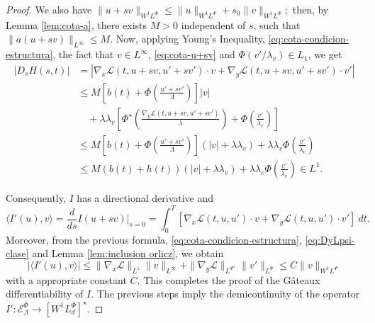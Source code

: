 \documentclass[twoside]{article}
\theoremstyle{remark}
\newcommand{\orlnor}{\|_{L^{\Phi}}}
\newcommand{\linf}{\|_{L^{\infty}}}
\newcommand{\lphi}{L^{\Phi}}
\newcommand{\lpsi}{L^{\Phi^{\star}}}
\newcommand{\wphi}{W^{1}\lphi}
\newcommand{\sobnor}{\|_{W^{1}\lphi}}
\newcommand{\domi}{\mathcal{E}^{\Phi}}
\renewcommand{\leq}{\leqslant}
\begin{document}
\begin{proof}
We also have
$
\|u+sv\sobnor\leq \|u\sobnor+s_0\|v\sobnor;
$
then, by Lemma \ref{lem:cota-a}, there exists $M>0$ independent of $s$, such that
$\|a(u+sv)\linf\leq M$. Now, applying Young's Inequality,  \eqref{eq:cota-condicion-estructura},
the fact that $v \in L^{\infty}$, \eqref{eq:cota-u+sv} and $\Phi(v'/\lambda_v)\in L_1$, 
we get
\begin{equation}\label{ctg}
\begin{split}
|D_s H(s,t)|&=\left| \nabla_x\mathcal{L}(t,u+sv,u'+sv')\cdot v +
  \nabla_y\mathcal{L}(t, u+s v, u'+sv')\cdot v'\right| \\
  & \leq M \left[ b(t)+ \Phi\left(\frac{u'+sv'}{\Lambda}\right)\right]|v|\\
 &\quad+ \lambda\lambda_v\left[\Phi^{\star}\left(\frac{\nabla_y\mathcal{L}(t,u+sv,u'+sv')}{\lambda}\right)+\Phi\left(\frac{v'}{\lambda_v}\right) \right]
\\
 &\leq 
 M \left[ b(t)+ \Phi\left(\frac{u'+sv'}{\Lambda}\right)\right] \left(|v|+\lambda\lambda_v\right) +\lambda\lambda_v \Phi\left(\frac{v'}{\lambda_v}\right)\\
  &\leq 
 M \left( b(t)+h(t)\right) \left(|v|+\lambda\lambda_v\right)+\lambda\lambda_v \Phi\left(\frac{v'}{\lambda_v}\right)
 \in L^1.
\end{split}
\end{equation}

Consequently, $I$ has a directional derivative and
\[
\langle I'(u),v \rangle=\frac{d}{ds}I(u+s v)\big|_{s=0}=\int_0^T  
\left[\nabla_x\mathcal{L}(t,u,u')\cdot v+ \nabla_y\mathcal{L}(t,u,u')\cdot v'\right] \ dt.
\]
Moreover, from the previous formula, \eqref{eq:cota-condicion-estructura},  \eqref{eq:DyLpsi-clase} and
Lemma \ref{lem:inclusion orlicz}, we obtain
\[
|\langle I'(u),v \rangle| \leq \|\nabla_x\mathcal{L}\|_{L^1} \| v\linf + 
\|\nabla_y\mathcal{L}\|_{\lpsi} \|v'\orlnor \leq C \|v\sobnor
\]
with a appropriate constant $C$.
This completes the proof of the G\^ateaux differentiability of $I$. 
The previous steps imply the demicontinuity of the operator $I':\domi_{\Lambda}  \to \left[\wphi_d
\right]^{\star} $.



\end{proof}
\end{document}
